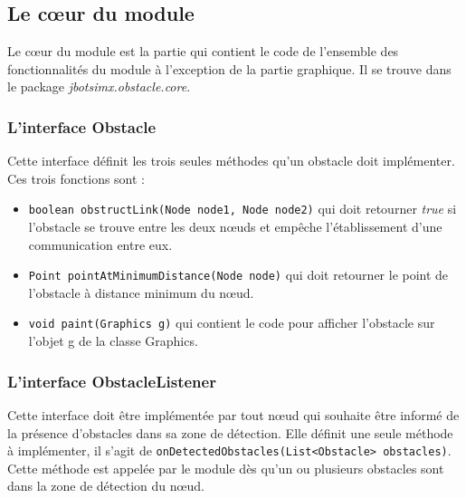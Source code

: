 \documentclass{article}
\newcommand{\obstacle}{{\tt Obstacle}\xspace}
\begin{document}


\subsection{Le c\oe ur du module}

Le c\oe ur du module est la partie qui contient le code de l'ensemble des fonctionnalités du module à l'exception de la partie graphique. Il se trouve dans le package \emph{jbotsimx.obstacle.core}.

\subsubsection{L'interface Obstacle}

Cette interface définit les trois seules méthodes qu'un obstacle doit implémenter. Ces trois fonctions sont : 


\begin{itemize}

\item \texttt{boolean obstructLink(Node node1, Node node2)} qui doit retourner \emph{true} si l'obstacle se trouve entre les deux n\oe uds et empêche l'établissement d'une communication entre eux.\medskip

\item \texttt{Point pointAtMinimumDistance(Node node)} qui doit retourner le point de l'obstacle à distance minimum du n\oe ud.\medskip

\item \texttt{void paint(Graphics g)} qui contient le code pour afficher l'obstacle sur l'objet g de la classe Graphics.
\end{itemize}


\subsubsection{L'interface ObstacleListener}
Cette interface doit être implémentée par tout n\oe ud qui souhaite être informé de la présence d'obstacles dans sa zone de détection. Elle définit une seule méthode à implémenter, il s'agit de \texttt{onDetectedObstacles(List<Obstacle> obstacles)}. Cette méthode est appelée par le module dès qu'un ou plusieurs obstacles sont dans la zone de détection du n\oe ud.
\end{document}
